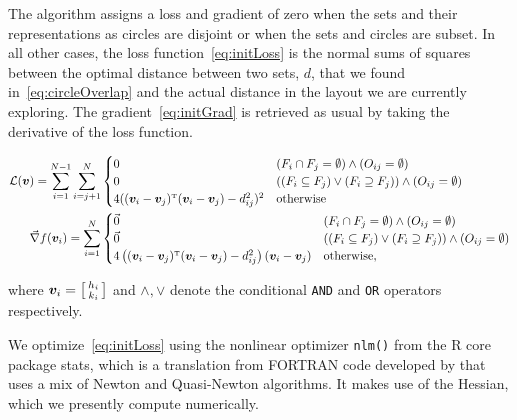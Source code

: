 \documentclass[
  a4paper,
  nofonts,
  nobib,
  nohyper,
  openany
]{tufte-book}\usepackage[]{graphicx}\usepackage[]{color}
\newcommand{\pkg}[1]{{\fontseries{b}\selectfont #1}}
\newcommand{\code}[1]{\texttt{#1}}
\begin{document}
The algorithm assigns a loss and gradient of zero when the sets and their representations as circles are disjoint or when the sets and circles are subset. In all other cases, the loss function~\eqref{eq:initLoss} is the normal sums of squares between the optimal distance between two sets, $d$, that we found in~\eqref{eq:circleOverlap} and the actual distance in the layout we are currently exploring. The gradient~\eqref{eq:initGrad} is retrieved as usual by taking the derivative of the loss function.
\begin{fullwidth}
\begin{align}
\mathcal{L}(\bm{v}) = \sum_{i=1}^{N-1} \sum_{i=j+1}^{N}
& \begin{cases}
  0 & (F_i \cap F_j = \emptyset) \wedge (O_{ij} = \emptyset)\\
  0 & \left((F_i \subseteq F_j) \vee (F_i \supseteq F_j)\right) \wedge (O_{ij}=\emptyset)\\
  4 ((\bm{v}_i - \bm{v}_j)^{\scriptscriptstyle\rm T}(\bm{v}_i - \bm{v}_j) - d_{ij}^2)^2  & \text{otherwise} \\
\end{cases} \label{eq:initLoss} \\
\vec{\nabla} f(\bm{v}_i) = \sum_{i=1}^N
& \begin{cases}
  \vec{0} & (F_i \cap F_j = \emptyset) \wedge (O_{ij} = \emptyset)\\
  \vec{0} & \left((F_i \subseteq F_j) \vee (F_i \supseteq F_j)\right) \wedge (O_{ij}=\emptyset)\\
  4 \left((\bm{v}_i - \bm{v}_j)^{\scriptscriptstyle\rm T}(\bm{v}_i - \bm{v}_j) - d_{ij}^2\right) (\bm{v}_i - \bm{v}_j) & \text{otherwise}, \\
\end{cases} \label{eq:initGrad}
\end{align}
\end{fullwidth}
where $\bm{v}_i = \begin{bsmallmatrix}h_i \\ k_i\end{bsmallmatrix}$ and $\wedge,\vee$ denote the conditional \texttt{AND} and \texttt{OR} operators respectively.

We optimize~\eqref{eq:initLoss} using the nonlinear optimizer \code{nlm()} from the R core package \pkg{stats}, which is a translation from FORTRAN code developed by \citet{schnabel_1985} that uses a mix of Newton and Quasi-Newton algorithms. It makes use of the Hessian, which we presently compute numerically.
\end{document}
